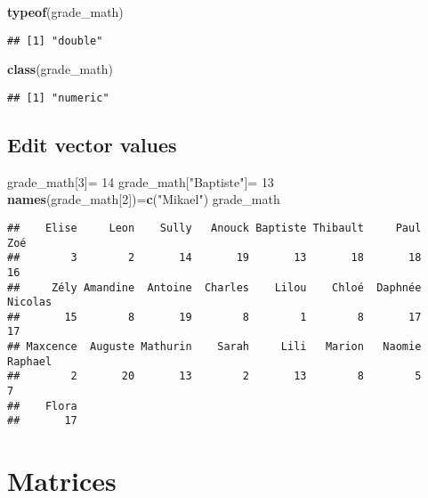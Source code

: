 \documentclass[
]{article}
\newenvironment{Shaded}{\begin{snugshade}}{\end{snugshade}}
\newcommand{\DecValTok}[1]{\textcolor[rgb]{0.00,0.00,0.81}{#1}}
\newcommand{\FunctionTok}[1]{\textcolor[rgb]{0.13,0.29,0.53}{\textbf{#1}}}
\newcommand{\NormalTok}[1]{#1}
\newcommand{\OtherTok}[1]{\textcolor[rgb]{0.56,0.35,0.01}{#1}}
\newcommand{\StringTok}[1]{\textcolor[rgb]{0.31,0.60,0.02}{#1}}
\begin{document}
\begin{Shaded}
\begin{Highlighting}[]
\FunctionTok{typeof}\NormalTok{(grade\_math)}
\end{Highlighting}
\end{Shaded}

\begin{verbatim}
## [1] "double"
\end{verbatim}

\begin{Shaded}
\begin{Highlighting}[]
\FunctionTok{class}\NormalTok{(grade\_math)}
\end{Highlighting}
\end{Shaded}

\begin{verbatim}
## [1] "numeric"
\end{verbatim}

\hypertarget{edit-vector-values}{%
\subsection{Edit vector values}\label{edit-vector-values}}

\begin{Shaded}
\begin{Highlighting}[]
\NormalTok{grade\_math[}\DecValTok{3}\NormalTok{]}\OtherTok{=} \DecValTok{14}
\NormalTok{grade\_math[}\StringTok{"Baptiste"}\NormalTok{]}\OtherTok{=} \DecValTok{13}
\FunctionTok{names}\NormalTok{(grade\_math[}\DecValTok{2}\NormalTok{])}\OtherTok{=}\FunctionTok{c}\NormalTok{(}\StringTok{"Mikael"}\NormalTok{)}
\NormalTok{grade\_math}
\end{Highlighting}
\end{Shaded}

\begin{verbatim}
##    Elise     Leon    Sully   Anouck Baptiste Thibault     Paul      Zoé 
##        3        2       14       19       13       18       18       16 
##     Zély Amandine  Antoine  Charles    Lilou    Chloé  Daphnée  Nicolas 
##       15        8       19        8        1        8       17       17 
## Maxcence  Auguste Mathurin    Sarah     Lili   Marion   Naomie  Raphael 
##        2       20       13        2       13        8        5        7 
##    Flora 
##       17
\end{verbatim}

\hypertarget{matrices}{%
\section{Matrices}\label{matrices}}
\end{document}
